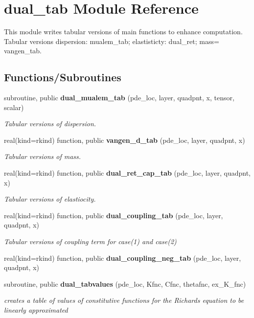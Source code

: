 \section{dual\+\_\+tab Module Reference}
\label{namespacedual__tab}


This module writes tabular versions of main functions to enhance computation. ~\newline
 Tabular versions dispersion\+: mualem\+\_\+tab; elastisticty\+: dual\+\_\+ret; mass= vangen\+\_\+tab.  


\subsection*{Functions/\+Subroutines}
\begin{DoxyCompactItemize}
\item 
subroutine, public {\bf dual\+\_\+mualem\+\_\+tab} (pde\+\_\+loc, layer, quadpnt, x, tensor, scalar)
\begin{DoxyCompactList}\small\item\em Tabular versions of dispersion. \end{DoxyCompactList}\item 
real(kind=rkind) function, public {\bf vangen\+\_\+d\+\_\+tab} (pde\+\_\+loc, layer, quadpnt, x)
\begin{DoxyCompactList}\small\item\em Tabular versions of mass. \end{DoxyCompactList}\item 
real(kind=rkind) function, public {\bf dual\+\_\+ret\+\_\+cap\+\_\+tab} (pde\+\_\+loc, layer, quadpnt, x)
\begin{DoxyCompactList}\small\item\em Tabular versions of elastiocity. \end{DoxyCompactList}\item 
real(kind=rkind) function, public {\bf dual\+\_\+coupling\+\_\+tab} (pde\+\_\+loc, layer, quadpnt, x)
\begin{DoxyCompactList}\small\item\em Tabular versions of coupling term for case(1) and case(2) \end{DoxyCompactList}\item 
real(kind=rkind) function, public {\bf dual\+\_\+coupling\+\_\+neg\+\_\+tab} (pde\+\_\+loc, layer, quadpnt, x)
\item 
subroutine, public {\bf dual\+\_\+tabvalues} (pde\+\_\+loc, Kfnc, Cfnc, thetafnc, ex\+\_\+\+K\+\_\+fnc)
\begin{DoxyCompactList}\small\item\em creates a table of values of constitutive functions for the Richards equation to be linearly approximated \end{DoxyCompactList}\end{DoxyCompactItemize}
